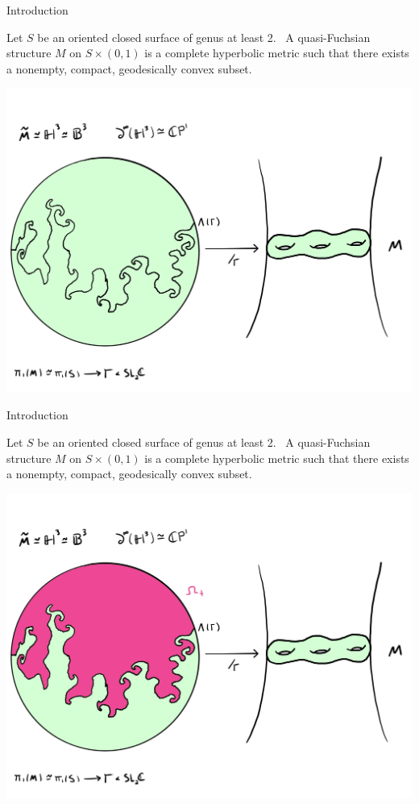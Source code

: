 \documentclass[professionalfont]{beamer}
\begin{document}



\begin{frame}{Introduction}

Let $S$ be an oriented closed surface of genus at least 2.  \ A quasi-Fuchsian structure $M$ on $S \times (0,1)$ is a complete hyperbolic metric such that there exists a nonempty, compact, geodesically convex subset.


\centering\includegraphics[scale=0.09]{QF-5.jpg}
	


\end{frame}





\begin{frame}{Introduction}

Let $S$ be an oriented closed surface of genus at least 2.  \ A quasi-Fuchsian structure $M$ on $S \times (0,1)$ is a complete hyperbolic metric such that there exists a nonempty, compact, geodesically convex subset.


\centering\includegraphics[scale=0.09]{QF-6.jpg}
	


\end{frame}
\end{document}

